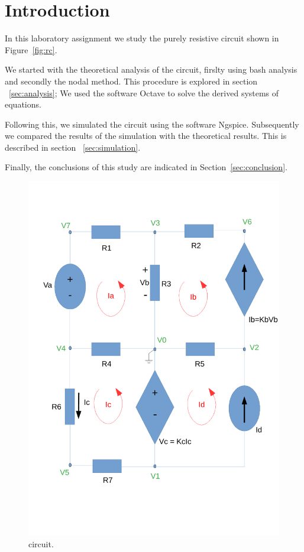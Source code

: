 \section{Introduction}
\label{sec:introduction}

In this laboratory assignment we study the purely resistive circuit 
shown in Figure~\ref{fig:rc}.



We started with the theoretical analysis of the circuit, 
firslty using bash analysis and secondly the nodal method. 
This procedure is explored in section ~\ref{sec:analysis};
We used the software Octave to solve the derived systems of equations.

Following this, we simulated the circuit using the software Ngspice. 
Subsequently we compared the results of the simulation with the theoretical
results. This is described in section ~\ref{sec:simulation}.

Finally, the conclusions of this study are indicated in
Section~\ref{sec:conclusion}.

\begin{figure}[ht] \centering
    \includegraphics[width=0.4\linewidth]{circuito_tcfe.pdf}
    \caption{circuit.}
    \label{fig:circuit}
\end{figure}
